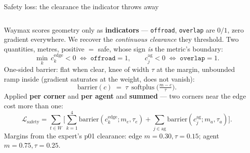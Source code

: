 \begin{frame}{Safety loss: the clearance the indicator throws away}
  \small
  \begin{columns}[T]
    Waymax scores geometry only as \textbf{indicators} --- \texttt{offroad},
    \texttt{overlap} are $0/1$, zero gradient everywhere. We recover the
    \emph{continuous clearance} they threshold. Two quantities, metres,
    positive $=$ safe, whose sign \emph{is} the metric's boundary:
    \[
      \min_{k}\, c^{\text{edge}}_{k} < 0 \;\Leftrightarrow\; \texttt{offroad}=1,
      \qquad
      c^{\text{ag}}_{j} < 0 \;\Leftrightarrow\; \texttt{overlap}=1 .
    \]
    One-sided barrier: flat when clear, knee of width $\tau$ at the margin,
    unbounded ramp inside (gradient saturates at the weight, does not vanish):
    \[
      \mathrm{barrier}(c) \;=\; \tau\,\operatorname{softplus}\!\Big(\tfrac{m-c}{\tau}\Big).
    \]
    Applied \textbf{per corner} and \textbf{per agent} and \textbf{summed} ---
    two corners near the edge cost more than one:
    \[
      \mathcal{L}_{\text{safety}}=\!\sum_{t\in W}\!\Big[
        \sum_{k=1}^{4}\!\mathrm{barrier}(c^{\text{edge}}_{k};m_e,\tau_e)
        +\!\!\sum_{j\in\text{ag}}\!\!\mathrm{barrier}(c^{\text{ag}}_{j};m_a,\tau_a)
      \Big].
    \]
    \footnotesize Margins from the expert's p01 clearance:
    edge $m{=}0.30,\tau{=}0.15$; agent $m{=}0.75,\tau{=}0.25$.


\end{columns}
\end{frame}

